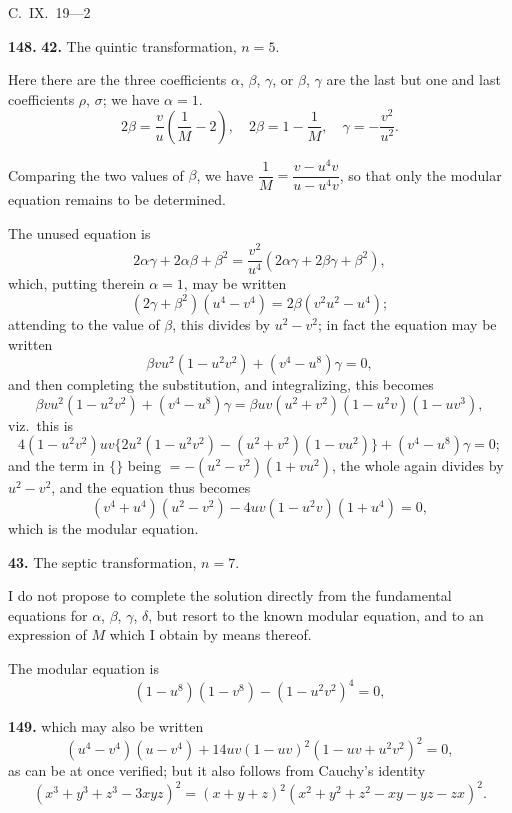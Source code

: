 \documentclass[11pt,a4paper]{article}
\theoremstyle{plain}
\begin{document}
\begin{flushright}
C.~IX.~19---2
\end{flushright}


\noindent\textbf{148.} \textbf{42.} The quintic transformation, $n = 5$.

Here there are the three coefficients $\alpha$, $\beta$, $\gamma$, or $\beta$, $\gamma$ are the last but one and last coefficients $\rho$, $\sigma$; we have $\alpha = 1$.
\[
2\beta = \frac{v}{u}\left(\frac{1}{M} - 2\right), \quad 2\beta = 1 - \frac{1}{M}, \quad \gamma = -\frac{v^2}{u^2}.
\]

Comparing the two values of $\beta$, we have $\dfrac{1}{M} = \dfrac{v - u^4v}{u - u^4v}$, so that only the modular equation remains to be determined.

The unused equation is
\[
2\alpha\gamma + 2\alpha\beta + \beta^2 = \frac{v^2}{u^4}(2\alpha\gamma + 2\beta\gamma + \beta^2),
\]
which, putting therein $\alpha = 1$, may be written
\[
(2\gamma + \beta^2)(u^4 - v^4) = 2\beta(v^2u^2 - u^4);
\]
attending to the value of $\beta$, this divides by $u^2 - v^2$; in fact the equation may be written
\[
\beta v u^2(1 - u^2v^2) + (v^4 - u^8)\gamma = 0,
\]
and then completing the substitution, and integralizing, this becomes
\[
\beta vu^2(1 - u^2v^2) + (v^4 - u^8)\gamma = \beta uv(u^2 + v^2)(1 - u^2v)(1 - uv^3),
\]
viz.\ this is
\[
4(1 - u^2v^2)uv\{2u^2(1 - u^2v^2) - (u^2 + v^2)(1 - vu^2)\} + (v^4 - u^8)\gamma = 0;
\]
and the term in $\{\}$ being $= -(u^2 - v^2)(1 + vu^2)$, the whole again divides by $u^2 - v^2$, and the equation thus becomes
\[
(v^4 + u^4)(u^2 - v^2) - 4uv(1 - u^2v)(1 + u^4) = 0,
\]
which is the modular equation.

\medskip
\noindent\textbf{43.} The septic transformation, $n = 7$.

I do not propose to complete the solution directly from the fundamental equations for $\alpha$, $\beta$, $\gamma$, $\delta$, but resort to the known modular equation, and to an expression of $M$ which I obtain by means thereof.

The modular equation is
\[
(1 - u^8)(1 - v^8) - (1 - u^2v^2)^4 = 0,
\]


\noindent\textbf{149.} which may also be written
\[
(u^4 - v^4)(u - v^4) + 14uv(1 - uv)^2(1 - uv + u^2v^2)^2 = 0,
\]
as can be at once verified; but it also follows from Cauchy's identity
\[
(x^3 + y^3 + z^3 - 3xyz)^2 = (x + y + z)^2(x^2 + y^2 + z^2 - xy - yz - zx)^2.
\]
\end{document}
